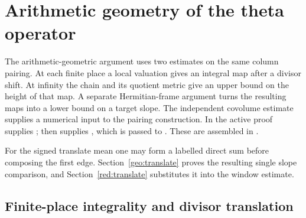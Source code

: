 \section{Arithmetic geometry of the theta operator}\label{geo:engine}

The arithmetic-geometric argument uses two estimates on the same column pairing. At each finite place a local valuation gives an integral map after a divisor shift. At infinity the chain and its quotient metric give an upper bound on the height of that map. A separate Hermitian-frame argument turns the resulting maps into a lower bound on a target slope. The independent covolume estimate supplies a numerical input to the pairing construction. In the active proof  supplies ;  then supplies , which is passed to . These are assembled in .

\noindent For the signed translate mean one may form a labelled direct sum before composing the first edge. Section~\ref{geo:translate} proves the resulting single slope comparison, and Section~\ref{red:translate} substitutes it into the window estimate. 

\subsection{Finite-place integrality and divisor translation}

